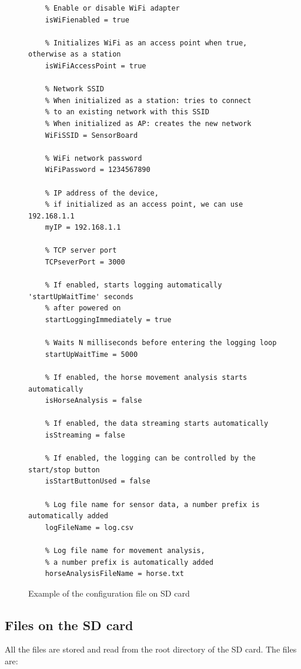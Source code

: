 \begin{figure}
    \centering
    \label{SBconfigFile}
    \caption{Example of the configuration file on SD card}
    \begin{verbatim}
    % Enable or disable WiFi adapter
    isWiFienabled = true
    
    % Initializes WiFi as an access point when true, otherwise as a station
    isWiFiAccessPoint = true
    
    % Network SSID
    % When initialized as a station: tries to connect
    % to an existing network with this SSID
    % When initialized as AP: creates the new network
    WiFiSSID = SensorBoard
    
    % WiFi network password
    WiFiPassword = 1234567890
    
    % IP address of the device,
    % if initialized as an access point, we can use 192.168.1.1
    myIP = 192.168.1.1
    
    % TCP server port
    TCPseverPort = 3000
    
    % If enabled, starts logging automatically 'startUpWaitTime' seconds
    % after powered on
    startLoggingImmediately = true
    
    % Waits N milliseconds before entering the logging loop
    startUpWaitTime = 5000
    
    % If enabled, the horse movement analysis starts automatically
    isHorseAnalysis = false
    
    % If enabled, the data streaming starts automatically
    isStreaming = false
    
    % If enabled, the logging can be controlled by the start/stop button
    isStartButtonUsed = false
    
    % Log file name for sensor data, a number prefix is automatically added
    logFileName = log.csv
    
    % Log file name for movement analysis,
    % a number prefix is automatically added
    horseAnalysisFileName = horse.txt
    \end{verbatim}
\end{figure}

\subsection{Files on the SD card}
All the files are stored and read from the root directory of the SD card. The files are:

